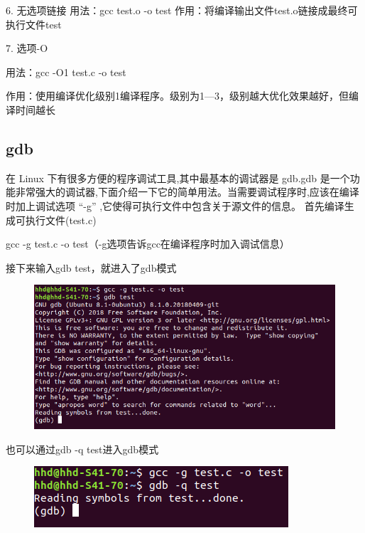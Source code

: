 \documentclass[12pt,a4paper]{article}
\begin{document}
6. 无选项链接
用法：gcc test.o -o test
作用：将编译输出文件test.o链接成最终可执行文件test

7. 选项-O

用法：gcc -O1 test.c -o test

作用：使用编译优化级别1编译程序。级别为1—3，级别越大优化效果越好，但编译时间越长



\subsection{ gdb }
在 Linux 下有很多方便的程序调试工具,其中最基本的调试器是 gdb.gdb 是一个功能非常强大的调试器,下面介绍一下它的简单用法。当需要调试程序时,应该在编译时加上调试选项 “-g” ,它使得可执行文件中包含关于源文件的信息。
首先编译生成可执行文件(test.c)

gcc -g test.c -o test（-g选项告诉gcc在编译程序时加入调试信息）

接下来输入gdb test，就进入了gdb模式
\begin{figure}[H]
\centering
\includegraphics[scale=0.5]{./figures/24.png}
\caption{}
\end{figure}
也可以通过gdb -q test进入gdb模式
\begin{figure}[H]
\centering
\includegraphics[scale=0.5]{./figures/25.png}
\caption{}
\end{figure}
\end{document}
